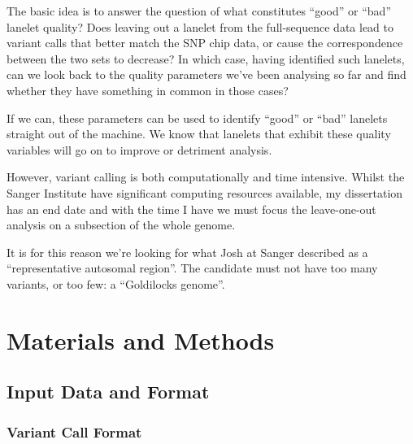 The basic idea is to answer the question of what constitutes “good” or
“bad” lanelet quality? Does leaving out a lanelet from the full-sequence data
lead to variant calls that better match the SNP chip data, or cause the
correspondence between the two sets to decrease? In which case, having
identified such lanelets, can we look back to the quality parameters we’ve been
analysing so far and find whether they have something in common in those cases?

If we can, these parameters can be used to identify “good” or “bad” lanelets
straight out of the machine. We know that lanelets that exhibit these quality
variables will go on to improve or detriment analysis.

However, variant calling is both computationally and time intensive.  Whilst
the Sanger Institute have significant computing resources available, my
dissertation has an end date and with the time I have we must focus the
leave-one-out analysis on a subsection of the whole genome.

It is for this reason we’re looking for what Josh at Sanger described as a
“representative autosomal region”. The candidate must not have too many
variants, or too few: a “Goldilocks genome”.

\chapter{Materials and Methods}
\section{Input Data and Format}
\subsection{Variant Call Format}

